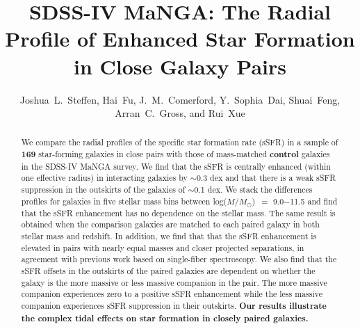 \documentclass[iop,revtex4,twocolumn,apj,numberedappendix,appendixfloats]{emulateapj}
\newcommand{\logm}{log($M/M_{\odot}$)}
\begin{document}
\title{
SDSS-IV MaNGA: The Radial Profile of Enhanced Star Formation in Close Galaxy Pairs
}

\author{
Joshua~L.~Steffen, Hai~Fu, J.~M.~Comerford, Y.~Sophia~Dai, Shuai~Feng, Arran~C.~Gross, and Rui~Xue
}

\begin{abstract}
We compare the radial profiles of the specific star formation rate (sSFR) in a sample of \textbf{169} star-forming galaxies in close pairs with those of mass-matched \textbf{control} galaxies in the SDSS-IV MaNGA survey. We find that the sSFR is centrally enhanced (within one effective radius) in interacting galaxies by $\sim$0.3 dex and that there is a weak sSFR suppression in the outskirts of the galaxies of $\sim$0.1 dex. We stack the differences profiles for galaxies in five stellar mass bins between \logm\ $=$ 9.0$-$11.5 and find that the sSFR enhancement has no dependence on the stellar mass. The same result is obtained when the comparison galaxies are matched to each paired galaxy in both stellar mass and redshift. In addition, we find that that the sSFR enhancement is elevated in pairs with nearly equal masses and closer projected separations, in agreement with previous work based on single-fiber spectroscopy. We also find that the sSFR offsets in the outskirts of the paired galaxies are dependent on whether the galaxy is the more massive or less massive companion in the pair. The more massive companion experiences zero to a positive sSFR enhancement while the less massive companion experiences sSFR suppression in their outskirts. \textbf{Our results illustrate the complex tidal effects on star formation in closely paired galaxies. }
\end{abstract}
\end{document}
